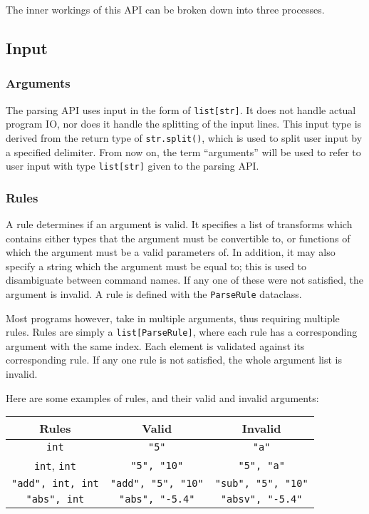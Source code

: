 \documentclass{article}
\begin{document}
		The inner workings of this API can be broken down into three processes.

		\subsection{Input}
			\subsubsection{Arguments}
				The parsing API uses input in the form of \verb|list[str]|. It does not handle
				actual program IO, nor does it handle the splitting of the input lines. This
				input type is derived from the return type of \verb|str.split()|, which is
				used to split user input by a specified delimiter. From now on, the term
				``arguments'' will be used to refer to user input with type \verb|list[str]|
				given to the parsing API\@.

			\subsubsection{Rules}
				A rule determines if an argument is valid. It specifies a list of transforms which
				contains either types that the argument must be convertible to, or functions of
				which the argument must be a valid parameters of. In addition, it may also specify
				a string which the argument must be equal to; this is used to disambiguate between
				command names. If any one of these were not satisfied, the argument is invalid. A
				rule is defined with the \verb|ParseRule| dataclass.

				Most programs however, take in multiple arguments, thus requiring multiple rules.
				Rules are simply a \verb|list[ParseRule]|, where each rule has a corresponding
				argument with the same index. Each element is validated against its corresponding
				rule. If any one rule is not satisfied, the whole argument list is invalid.

				Here are some examples of rules, and their valid and invalid arguments:

				\begin{center}
					\begin{tabular}{|c|c|c|}
						\hline
						Rules & Valid & Invalid
						\\ \hline
							\verb|int| &
							\verb|"5"| &
							\verb|"a"|
						\\ \hline
							\verb|int|, \verb|int| &
							\verb|"5", "10"| &
							\verb|"5", "a"|
						\\ \hline
							\verb|"add", int, int| &
							\verb|"add", "5", "10"| &
							\verb|"sub", "5", "10"|
						\\ \hline
							\verb|"abs", int| &
							\verb|"abs", "-5.4"| &
							\verb|"absv", "-5.4"|
						\\\hline
					\end{tabular}
				\end{center}
\end{document}
